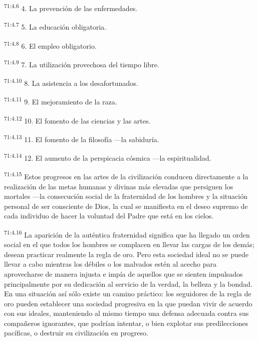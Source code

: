 \documentclass[twoside, 11pt]{book}
\begin{document}
\par
\textsuperscript{71:4.6} 4. La prevención de las enfermedades.

\par
\textsuperscript{71:4.7} 5. La educación obligatoria.

\par
\textsuperscript{71:4.8} 6. El empleo obligatorio.

\par
\textsuperscript{71:4.9} 7. La utilización provechosa del tiempo libre.

\par
\textsuperscript{71:4.10} 8. La asistencia a los desafortunados.

\par
\textsuperscript{71:4.11} 9. El mejoramiento de la raza.

\par
\textsuperscript{71:4.12} 10. El fomento de las ciencias y las artes.

\par
\textsuperscript{71:4.13} 11. El fomento de la filosofía ---la sabiduría.

\par
\textsuperscript{71:4.14} 12. El aumento de la perspicacia cósmica ---la espiritualidad.

\par
\textsuperscript{71:4.15} Estos progresos en las artes de la civilización conducen directamente a la realización de las metas humanas y divinas más elevadas que persiguen los mortales ---la consecución social de la fraternidad de los hombres y la situación personal de ser consciente de Dios, la cual se manifiesta en el deseo supremo de cada individuo de hacer la voluntad del Padre que está en los cielos.

\par
\textsuperscript{71:4.16} La aparición de la auténtica fraternidad significa que ha llegado un orden social en el que todos los hombres se complacen en llevar las cargas de los demás; desean practicar realmente la regla de oro. Pero esta sociedad ideal no se puede llevar a cabo mientras los débiles o los malvados estén al acecho para aprovecharse de manera injusta e impía de aquellos que se sienten impulsados principalmente por su dedicación al servicio de la verdad, la belleza y la bondad. En una situación así sólo existe un camino práctico: los seguidores de la regla de oro pueden establecer una sociedad progresiva en la que puedan vivir de acuerdo con sus ideales, manteniendo al mismo tiempo una defensa adecuada contra sus compañeros ignorantes, que podrían intentar, o bien explotar sus predilecciones pacíficas, o destruir su civilización en progreso.
\end{document}
